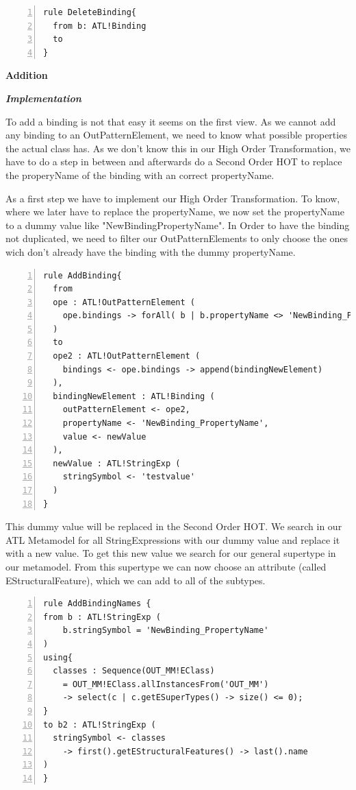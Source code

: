 \documentclass{llncs}
\begin{document}
\begin{lstlisting}[language=ATL, numbers=left,xleftmargin=5.0ex, caption=Definition of Delete-Binding., label=lst:delete]
rule DeleteBinding{
  from b: ATL!Binding
  to
}
\end{lstlisting}

\textbf{Addition}

\textbf\textit{{Implementation}}

To add a binding is not that easy it seems on the first view.
As we cannot add any binding to an OutPatternElement, we need to know what possible properties the actual class has.
As we don't know this in our High Order Transformation, we have to do a step in between and afterwards do a Second Order HOT to replace the properyName of the binding with an correct propertyName.

As a first step we have to implement our High Order Transformation. To know, where we later have to replace the propertyName, we now set the propertyName to a dummy value like "NewBindingPropertyName".
In Order to have the binding not duplicated, we need to filter our OutPatternElements to only choose the ones wich don't already have the binding with the dummy propertyName.

\begin{lstlisting}[language=ATL, numbers=left,xleftmargin=5.0ex, caption=AddBinding-Definition, label=lst:addbinding]
rule AddBinding{
  from 
  ope : ATL!OutPatternElement ( 
    ope.bindings -> forAll( b | b.propertyName <> 'NewBinding_PropertyName')
  )
  to
  ope2 : ATL!OutPatternElement (
    bindings <- ope.bindings -> append(bindingNewElement)
  ), 
  bindingNewElement : ATL!Binding (
    outPatternElement <- ope2,
    propertyName <- 'NewBinding_PropertyName',
    value <- newValue	
  ),
  newValue : ATL!StringExp (
    stringSymbol <- 'testvalue'
  )	
}
\end{lstlisting}

This dummy value will be replaced in the Second Order HOT.
We search in our ATL Metamodel for all StringExpressions with our dummy value and replace it with a new value.
To get this new value we search for our general supertype in our metamodel. From this supertype we can now choose an attribute (called EStructuralFeature), which we can add to all of the subtypes.

\begin{lstlisting}[language=ATL, numbers=left,xleftmargin=5.0ex, caption=AddBindingNames-Definition., label=lst:addbindingnames]
rule AddBindingNames {
from b : ATL!StringExp (
    b.stringSymbol = 'NewBinding_PropertyName'
)
using{
  classes : Sequence(OUT_MM!EClass) 
	= OUT_MM!EClass.allInstancesFrom('OUT_MM') 
	-> select(c | c.getESuperTypes() -> size() <= 0);
}
to b2 : ATL!StringExp ( 
  stringSymbol <- classes 
	-> first().getEStructuralFeatures() -> last().name
)	
}
\end{lstlisting}
\end{document}
